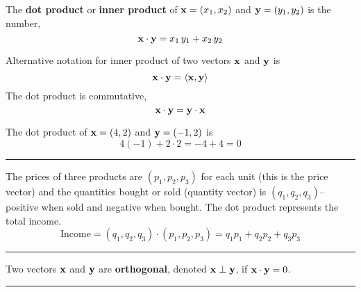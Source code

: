 \begin{tcolorbox}[colback=yellow!10!,colframe=gray!15!]
\begin{definition}
The \textbf{dot product} or \textbf{inner product} of ${\bf x} = (x_1, x_2)$ and  ${\bf y} = (y_1, y_2)$ is the number, 
\[ {\bf x} \cdot {\bf y} = x_1 \, y_1 + x_2 \, y_2 \]

Alternative notation for inner product of two vectors ${\bf x}$ and  ${\bf y}$ is 
\[ {\bf x} \cdot {\bf y} = \langle {\bf x}, {\bf y}  \rangle \]
The dot product is commutative, 
\[  {\bf x} \cdot {\bf y}  = {\bf y} \cdot {\bf x} \]
\end{definition}	 
\end{tcolorbox} 



\begin{example}
	The dot product of  ${\bf x} =(4,2)$ and  ${\bf y} =(-1,2)$ is
	\[ 4(-1)+2 \cdot 2 = -4 + 4 = 0  \]
\end{example}

\rule[0.01in]{\textwidth}{0.0025in}








\begin{example}
	The prices of three products are $(p_1, p_2, p_3)$ for each unit (this is the price vector) and the quantities bought or sold (quantity vector) is $(q_1, q_2, q_3)$--positive when sold and negative when bought.  The dot product represents the total income.
	\[ \text{Income} = (q_1, q_2, q_3) \cdot (p_1, p_2, p_3)  = q_1p_1 + q_2p_2+q_3 p_3 \]
	
	
	\end{example}

\rule[0.01in]{\textwidth}{0.0025in}











\begin{definition}
 Two vectors ${\bf x}$ and ${\bf y}$  are \textbf{orthogonal}, denoted ${\bf x} \perp {\bf y}$,  if ${\bf x} \cdot {\bf y} = 0$.   
\end{definition}

\rule[0.01in]{\textwidth}{0.0025in}


